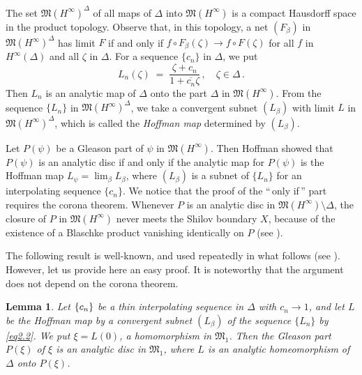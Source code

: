 \documentclass[12pt]{amsart}
\theoremstyle{plain}
\newtheorem{lem}{Lemma}[section]
\numberwithin{equation}{section}
\begin{document}
\medskip
The set $\mathfrak{M}(H^\infty)^{\Delta}$ of all maps of $\Delta$ into
$\mathfrak{M}(H^\infty)$ is a compact Hausdorff space in the product
topology. Observe that, in this topology, a net $(F_\beta)$ in
$\mathfrak{M}(H^\infty)^{\Delta}$ has limit $F$ if and only if
$f\circ F_\beta(\zeta)\rightarrow f\circ F(\zeta)$ for all $f$
in $H^\infty(\Delta)$ and all $\zeta$ in $\Delta$.
For a sequence $\{c_n\}$ in $\Delta$, we put
\begin{equation}
\label{eq2.2}
L_n(\zeta)\;=\;
\frac{\zeta+c_n}{1+\overline{c_n}\zeta}\,,\quad
\zeta \in \Delta\,.
\end{equation}
Then $L_n$ is an analytic map of $\Delta$ onto the part $\Delta$ in
$\mathfrak{M}(H^\infty)$. From the sequence $\{L_n\}$ in $\mathfrak{M}(H^\infty)^{\Delta}$, we take a convergent subnet $(L_\beta)$
with limit $L$ in $\mathfrak{M}(H^\infty)^{\Delta}$, which is called the
\textit{Hoffman map} determined by $(L_\beta)$.

Let $P(\psi)$ be a Gleason part of $\psi$ in $\mathfrak{M}(H^\infty)$.
Then Hoffman showed that $P(\psi)$ is an analytic disc if and
only if the analytic map for $P(\psi)$ is the Hoffman map
$L_{\psi}=\lim_\beta L_\beta$, where $(L_\beta)$ is
a subnet of $\{L_n\}$ for an interpolating sequence $\{c_n\}$.
We notice that the proof of the ``\,only if\,'' part requires the
corona theorem. Whenever $P$ is an analytic disc in $\mathfrak{M}(H^\infty)\setminus \Delta$, the closure of
$P$ in $\mathfrak{M}(H^\infty)$ never meets the
Shilov boundary $X$, because of the existence of a Blaschke
product vanishing identically on $P$ (see \cite[102p]{H2}).

\medskip
The following result is well-known, and used repeatedly
in what follows (see \cite[Chapter X, Excercise 8]{Ga}).
However, let us provide here an easy proof. It is noteworthy
that the argument does not depend on the corona theorem.
\begin{lem}
\label{lem2.2}
Let $\/ \{c_n\}$ be a thin interpolating sequence
in $\Delta$ with $c_n\to 1$, and let $L$ be the Hoffman
map by a convergent subnet $(L_\beta)$ of the sequence
$\{L_n\}$ by \eqref{eq2.2}. We put $\xi=L(0)$, a homomorphism
in $\mathfrak{M}_1$. Then the Gleason part $P(\xi)$ of $\xi$
is an analytic disc in $\mathfrak{M}_1$, where $L$ is an
analytic homeomorphism of $\Delta$ onto $P(\xi)$.
\end{lem}
\end{document}
